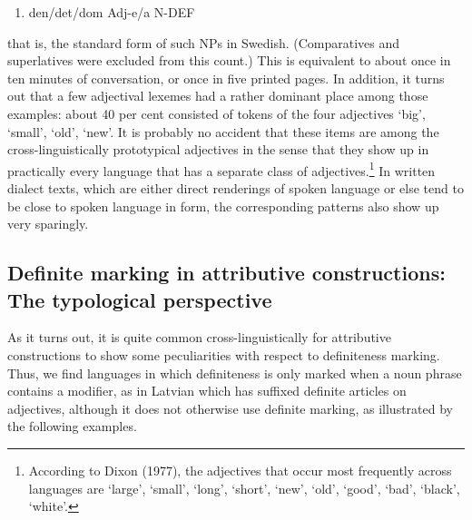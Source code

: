 \begin{enumerate} %
\item 
den/det/dom Adj-e/a N-DEF

\end{enumerate} %
that is, the standard form of such NPs in Swedish. (Comparatives and superlatives were excluded from this count.) This is equivalent to about once in ten minutes of conversation, or once in five printed pages. In addition, it turns out that a few adjectival lexemes had a rather dominant place among those examples: about 40 per cent consisted of tokens of the four adjectives ‘big’,  ‘small’,  ‘old’,  ‘new’. It is probably no accident that these items are among the cross-linguistically prototypical adjectives in the sense that they show up in practically every language that has a separate class of adjectives.\footnote{\label{fnt:ftn36} According to Dixon (1977), the adjectives that occur most frequently across languages are ‘large’, ‘small’, ‘long’, ‘short’, ‘new’, ‘old’, ‘good’, ‘bad’, ‘black’, ‘white’.} In written dialect texts, which are either direct renderings of spoken language or else tend to be close to spoken language in form, the corresponding patterns also show up very sparingly.

\subsection[Definite marking in attributive constructions: The typological perspective]{\rmfamily Definite marking in attributive constructions: The typological perspective}
As it turns out, it is quite common cross-linguistically for attributive constructions to show some peculiarities with respect to definiteness marking. Thus, we find languages in which definiteness is only marked when a noun phrase contains a modifier, as in Latvian which has suffixed definite articles on adjectives, although it does not otherwise use definite marking, as illustrated by the following examples. 

